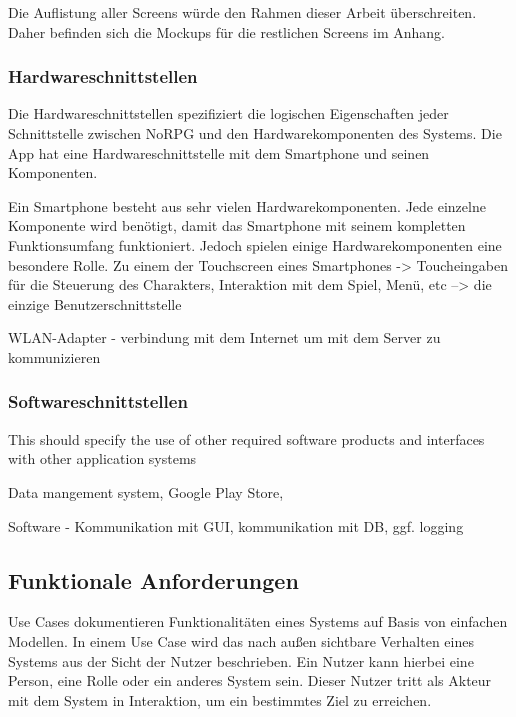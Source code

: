 			Die Auflistung aller Screens würde den Rahmen dieser Arbeit überschreiten. Daher befinden sich die Mockups für die restlichen Screens im Anhang.
						
			
		
		\subsubsection{Hardwareschnittstellen}
			Die Hardwareschnittstellen spezifiziert die logischen Eigenschaften jeder Schnittstelle zwischen NoRPG und den Hardwarekomponenten des Systems. Die App hat eine  Hardwareschnittstelle mit dem Smartphone und seinen Komponenten.
			
			Ein Smartphone besteht aus sehr vielen Hardwarekomponenten. Jede einzelne Komponente wird benötigt, damit das Smartphone mit seinem kompletten Funktionsumfang funktioniert. Jedoch spielen einige Hardwarekomponenten eine besondere Rolle. Zu einem der Touchscreen eines Smartphones -> Toucheingaben für die Steuerung des Charakters, Interaktion mit dem Spiel, Menü, etc --> die einzige Benutzerschnittstelle
			
			WLAN-Adapter - verbindung mit dem Internet um mit dem Server zu kommunizieren
			
		\subsubsection{Softwareschnittstellen}
			This should specify the use of other required software products and interfaces with other application systems 
			
			Data mangement system, Google Play Store, 
			
			Software - Kommunikation mit GUI, kommunikation mit DB, ggf. logging

	\subsection{Funktionale Anforderungen}
		Use Cases dokumentieren Funktionalitäten eines Systems auf Basis von einfachen Modellen. In einem Use Case wird das nach außen sichtbare Verhalten eines Systems aus der Sicht der Nutzer beschrieben. Ein Nutzer kann hierbei eine Person, eine Rolle oder ein anderes System sein. Dieser Nutzer tritt als Akteur mit dem System in Interaktion, um ein bestimmtes Ziel zu erreichen. %
		
